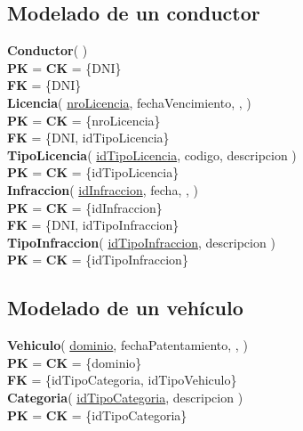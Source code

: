 \subsection{Modelado de un conductor}

\textbf{Conductor}(
)\\
\textbf{PK} = \textbf{CK} = \{DNI\}\\
\textbf{FK} = \{DNI\}\\

\textbf{Licencia}(
    \uline{nroLicencia},
    fechaVencimiento,
    ,
)\\
\textbf{PK} = \textbf{CK} = \{nroLicencia\}\\
\textbf{FK} = \{DNI, idTipoLicencia\}\\

\textbf{TipoLicencia}(
    \uline{idTipoLicencia},
    codigo,
    descripcion
)\\
\textbf{PK} = \textbf{CK} = \{idTipoLicencia\}\\

\textbf{Infraccion}(
    \uline{idInfraccion},
    fecha,
    ,
)\\
\textbf{PK} = \textbf{CK} = \{idInfraccion\}\\
\textbf{FK} = \{DNI, idTipoInfraccion\}\\

\textbf{TipoInfraccion}(
    \uline{idTipoInfraccion},
    descripcion
)\\
\textbf{PK} = \textbf{CK} = \{idTipoInfraccion\}\\

\subsection{Modelado de un vehículo}

\textbf{Vehiculo}(
    \uline{dominio},
    fechaPatentamiento,
    ,
)\\
\textbf{PK} = \textbf{CK} = \{dominio\}\\
\textbf{FK} = \{idTipoCategoria, idTipoVehiculo\}\\

\textbf{Categoria}(
    \uline{idTipoCategoria},
    descripcion
)\\
\textbf{PK} = \textbf{CK} = \{idTipoCategoria\}\\

